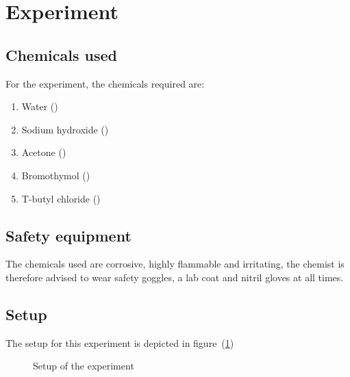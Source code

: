 \documentclass[12pt]{article}
\begin{document}
\section{Experiment}

\subsection{Chemicals used}
For the experiment, the chemicals required are:
\begin{enumerate}
    \item Water ()
    \item Sodium hydroxide ()
    \item Acetone () \cite{Acetone}
    \item Bromothymol () \cite{Bromothymol}
    \item T-butyl chloride () \cite{T-Butyl Chloride}
\end{enumerate}

\subsection{Safety equipment}

The chemicals used are corrosive, highly flammable and irritating, the chemist is therefore advised to wear safety goggles, a lab coat and nitril gloves at all times.

\subsection{Setup}

The setup for this experiment is depicted in figure~(\ref{fig:setup})
\begin{figure}[!ht]
    \centering
    \caption{Setup of the experiment}
    \label{fig:setup}
\end{figure}
\FloatBarrier
\end{document}
